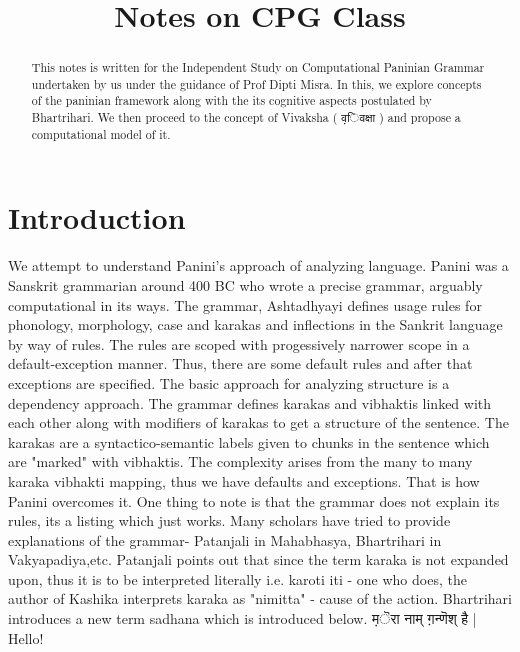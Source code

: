 \documentclass[a4paper,10pt]{article}
\title{Notes on CPG Class}
\author{}
\begin{document}
\maketitle

\newpage

\tableofcontents

\newpage

\begin{abstract}

  This notes is written for the Independent Study on Computational Paninian Grammar undertaken by us under the guidance of Prof Dipti Misra.
  In this, we explore concepts of the paninian framework along with the its cognitive aspects postulated by Bhartrihari.
  We then proceed to the concept of Vivaksha ( {\d विवक्षा }) and propose a computational model of it.

\end{abstract}
\newpage
\section{Introduction}
We attempt to understand Panini's approach of analyzing language. Panini was a Sanskrit grammarian around 400 BC who wrote a precise grammar, arguably computational in its ways. The grammar, Ashtadhyayi  defines usage rules for phonology, morphology, case and karakas and inflections in the Sankrit language by way of rules. The rules are scoped with progessively narrower scope in a default-exception manner. Thus, there are some default rules and after that exceptions are specified.
The basic approach for analyzing structure is a dependency approach. The grammar defines karakas and vibhaktis linked with each other along with modifiers of karakas to get a structure of the sentence. The karakas are a syntactico-semantic labels given to chunks in the sentence which are "marked" with vibhaktis. The complexity arises from the many to many karaka vibhakti mapping, thus we have defaults and exceptions. That is how Panini overcomes it.
One thing to note is that the grammar does not explain its rules, its a listing which just works. Many scholars have tried to provide explanations of the grammar- Patanjali in Mahabhasya, Bhartrihari in Vakyapadiya,etc. Patanjali points out that since the term karaka is not expanded upon, thus it is to be interpreted literally i.e. karoti iti - one who does, the author of Kashika interprets karaka as "nimitta" - cause of the action. Bhartrihari introduces a new term sadhana which is introduced below.
{\d मॆरा नाम् ग़न्णॆश् है |} Hello!
\end{document}
